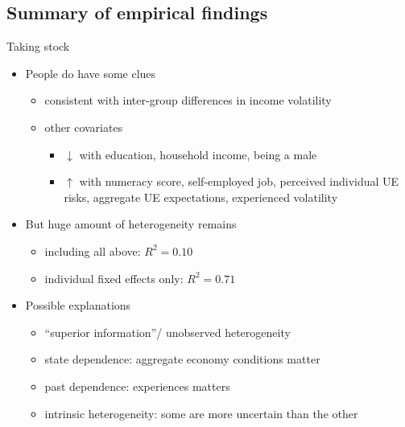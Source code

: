 \documentclass{beamer}
\begin{document}
\subsection{Summary of empirical findings}
\begin{frame}{Taking stock}
	
	\begin{itemize}
		\item People do have some clues 
		\begin{itemize}
			\item  consistent with inter-group differences in income volatility
			\item other covariates 
			\begin{itemize}
				\item $\downarrow$ with education, household income, being a male
				\item $\uparrow$  with numeracy score, self-employed job, perceived individual UE risks, aggregate UE expectations, experienced volatility 
			\end{itemize}
		\end{itemize}
		\pause
		\item But huge amount of heterogeneity remains
		\begin{itemize}
			\item including all above: $R^2 =0.10$
			\item individual fixed effects only: $R^2=0.71$
		\end{itemize}
		\pause
		\item Possible explanations
		\begin{itemize}
			\item ``superior information''/ unobserved heterogeneity
			\item state dependence: aggregate economy conditions matter  
			\item past dependence: experiences matters \cite{kuchler2019personal}
			\item intrinsic heterogeneity: some are more uncertain than the other \cite{ben2018expectations} 
		\end{itemize}
	\end{itemize} 
\end{frame}
\end{document}
